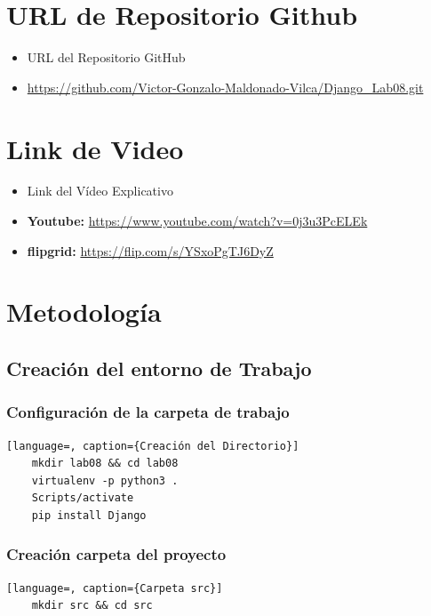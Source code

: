 \documentclass{article}
\begin{document}

  \section{URL de Repositorio Github}
  \begin{itemize}
    \item URL del Repositorio GitHub
    \item \url{https://github.com/Victor-Gonzalo-Maldonado-Vilca/Django_Lab08.git}
  \end{itemize}
  

	\section{Link de Video}
  \begin{itemize}
    \item Link del Vídeo Explicativo
    \item \textbf{Youtube: } \url{https://www.youtube.com/watch?v=0j3u3PcELEk}
    \item \textbf{flipgrid: } \url{https://flip.com/s/YSxoPgTJ6DyZ}
  \end{itemize}


  \section{Metodología}
  

  \subsection{Creación del entorno de Trabajo}
  

  \subsubsection{Configuración de la carpeta de trabajo}
  \begin{lstlisting}[language=, caption={Creación del Directorio}]
    mkdir lab08 && cd lab08
    virtualenv -p python3 .
    Scripts/activate
    pip install Django
  \end{lstlisting}
  

  \subsubsection{Creación carpeta del proyecto}
  \begin{lstlisting}[language=, caption={Carpeta src}]
    mkdir src && cd src
  \end{lstlisting}
  
\end{document}

